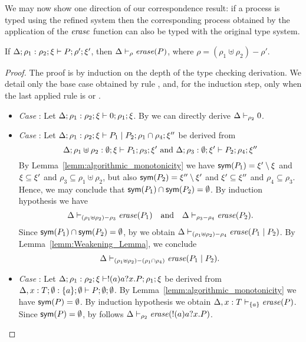 We may now show one direction of our correspondence result: if a process is typed using the refined system then the corresponding process obtained by the application of the $\mathit{erase}$ function can also be typed with the original type system.





\begin{lemma}{\label{lemm:algorithmic_soundness}}
If $\Delta; \rho_1: \rho_2; \xi \vdash P; \rho'; \xi'$, then $\Delta \vdash_{\rho} \mathit{erase}(P)$, where $\rho=(\rho_1\uplus\rho_2)- \rho'$.
\end{lemma}

\begin{proof}
The proof is by induction on the depth of the type checking derivation. We detail only the base case obtained by rule , and, for the induction step, only when the last applied rule is  or .
\begin{itemize}
\item
\emph{Case} : Let $\Delta; \rho_1: \rho_2; \xi \vdash 0; \rho_1; \xi$. 
By  we can directly derive $\Delta \vdash_{\rho_2} 0$.
%
%
\item
\emph{Case} : Let $\Delta; \rho_1: \rho_2; \xi \vdash P_1 \;|\; P_2; \rho_1 \cap \rho_4; \xi''$ be derived from 
\[
\Delta; \rho_1\uplus \rho_2: \emptyset; \xi \vdash P_1; \rho_3; \xi'  \text{ and } \Delta; \rho_3: \emptyset ; \xi' \vdash P_2; \rho_4; \xi''
\]
By Lemma~\ref{lemm:algorithmic_monotonicity} we have $\mathsf{sym}(P_1)=\xi'\setminus \xi$ and $\xi \subseteq \xi'$ and $\rho_3 \subseteq \rho_1\uplus\rho_2$, but also $\mathsf{sym}(P_2)=\xi''\setminus \xi'$ and $\xi' \subseteq \xi''$ and $\rho_4\subseteq \rho_3$. 
Hence, we may conclude that $\mathsf{sym}(P_1)\cap \mathsf{sym}(P_2)=\emptyset$. 
By induction hypothesis we have 
$$\Delta \vdash_{(\rho_1\uplus\rho_2)-\rho_3} \mathit{erase}(P_1) \quad \mbox{and} \quad \Delta \vdash_{\rho_3-\rho_4} \mathit{erase}(P_2).$$ 
Since $\mathsf{sym}(P_1)\cap \mathsf{sym}(P_2)=\emptyset$, by  we obtain $\Delta \vdash_{(\rho_1\uplus \rho_2)-\rho_4} \mathit{erase}(P_1 \;|\; P_2)$. 
By Lemma~\ref{lemm:Weakening_Lemma}, we conclude 
$$\Delta \vdash_{(\rho_1\uplus\rho_2)-(\rho_1\cap \rho_4)} \mathit{erase}(P_1 \;|\; P_2).$$
%
%
\item
\emph{Case} : Let $\Delta; \rho_1: \rho_2; \xi \vdash !(a)a?x.P; \rho_1; \xi$ be derived from $\Delta, x: T; \emptyset: \{a\}; \emptyset \vdash P; \emptyset; \emptyset$. 
By Lemma~\ref{lemm:algorithmic_monotonicity} we have $\mathsf{sym}(P)= \emptyset$. 
By induction hypothesis we obtain $\Delta, x: T \vdash_{\{a\}} \mathit{erase}(P)$. 
Since $\mathsf{sym}(P)= \emptyset$, by  follows $\Delta \vdash_{\rho_2} \mathit{erase}(!(a)a?x.P)$.
\end{itemize}
\end{proof}



